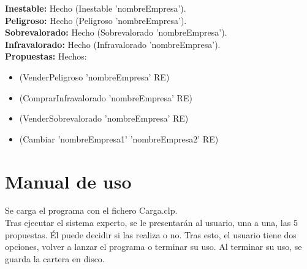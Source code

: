 \textbf{Inestable:} Hecho (Inestable 'nombreEmpresa').\\

\textbf{Peligroso:} Hecho (Peligroso 'nombreEmpresa').\\

\textbf{Sobrevalorado:} Hecho (Sobrevalorado 'nombreEmpresa').\\

\textbf{Infravalorado:} Hecho (Infravalorado 'nombreEmpresa').\\

\textbf{Propuestas:} Hechos:
\begin{itemize}
\item (VenderPeligroso 'nombreEmpresa' RE)
\item (ComprarInfravalorado 'nombreEmpresa' RE)
\item (VenderSobrevalorado 'nombreEmpresa' RE)
\item (Cambiar 'nombreEmpresa1' 'nombreEmpresa2' RE)
\end{itemize}

\newpage
\section{Manual de uso}

Se carga el programa con el fichero Carga.clp.\\

Tras ejecutar el sistema experto, se le presentarán al usuario, una a una, las 5 propuestas. Él puede decidir si las realiza o no. Tras esto, el usuario tiene dos opciones, volver a lanzar el programa o terminar su uso. Al terminar su uso, se guarda la cartera en disco.\\
